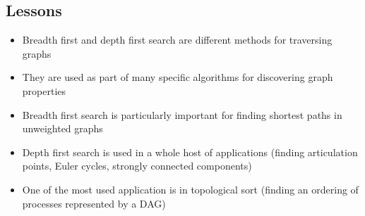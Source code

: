 
\begin{slide}
\section{Lessons}

\begin{PauseHighLight}
  \begin{itemize}
  \item Breadth first and depth first search are different methods for
    traversing graphs\pause
  \item They are used as part of many specific algorithms for discovering
    graph properties\pause
  \item Breadth first search is particularly important for finding
    shortest paths in unweighted graphs\pause
  \item Depth first search is used in a whole host of applications
    (finding articulation points, Euler cycles, strongly connected
    components)\pause
  \item One of the most used application is in topological sort (finding
    an ordering of processes represented by a DAG)\pause
  \end{itemize}
\end{PauseHighLight}

\end{slide}
